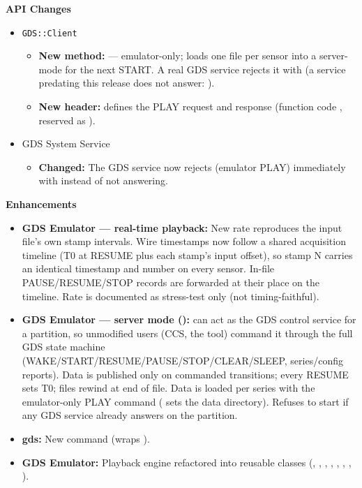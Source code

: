 \noindent\textbf{API Changes}\par\nobreak
\begin{itemize}\compactlist
  \item \texttt{GDS::Client}
  \begin{itemize}\compactlist
    \item \textbf{New method:}  ---
      emulator-only; loads one file per sensor into a server-mode
       for the next START. A real GDS service rejects it with
       (a service predating this release does not answer:
      ).
    \item \textbf{New header:}  defines the PLAY request and
      response (function code , reserved as ).
  \end{itemize}
  \item GDS System Service
  \begin{itemize}\compactlist
    \item \textbf{Changed:} The GDS service now rejects  (emulator PLAY)
      immediately with  instead of not answering.
  \end{itemize}
\end{itemize}
\noindent\textbf{Enhancements}\par\nobreak
\begin{itemize}\compactlist
  \item \textbf{GDS Emulator --- real-time playback:} New  rate reproduces the
    input file's own stamp intervals. Wire timestamps now follow a shared
    acquisition timeline (T0 at RESUME plus each stamp's input offset), so
    stamp N carries an identical timestamp and number on every sensor.
    In-file PAUSE/RESUME/STOP records are forwarded at their place on the
    timeline. Rate  is documented as stress-test only (not
    timing-faithful).
  \item \textbf{GDS Emulator --- server mode ():}  can act as the
    GDS control service for a partition, so unmodified  users
    (CCS, the  tool) command it through the full GDS state machine
    (WAKE/START/RESUME/PAUSE/STOP/CLEAR/SLEEP, series/config reports).
    Data is published only on commanded transitions; every RESUME sets T0;
    files rewind at end of file. Data is loaded per series with the
    emulator-only PLAY command ( sets the data directory). Refuses to
    start if any GDS service already answers on the partition.
  \item \textbf{gds:} New  command (wraps
    ).
  \item \textbf{GDS Emulator:} Playback engine refactored into reusable classes
    (, , , , ,
    , , ).
\end{itemize}

